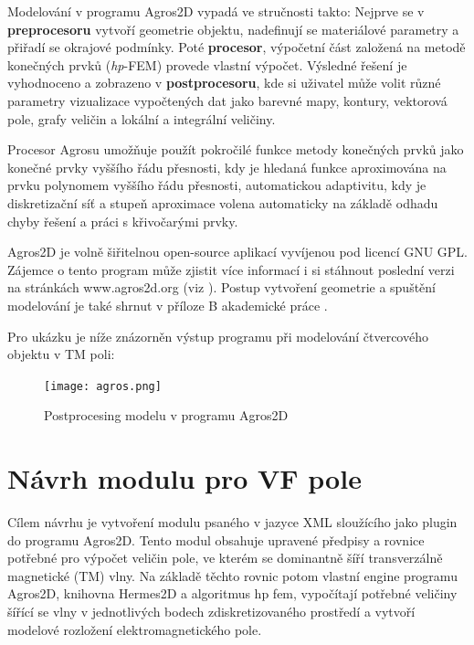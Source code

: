\documentclass[12pt,a4paper,oneside]{article}
\numberwithin{equation}{section} %
\numberwithin{figure}{section} %
\numberwithin{table}{section} %
\begin{document}
Modelování v programu Agros2D vypadá ve stručnosti takto: Nejprve se v \textbf{preprocesoru} vytvoří geometrie objektu, nadefinují se materiálové parametry a přiřadí se okrajové podmínky. Poté \textbf{procesor}, výpočetní část založená na metodě konečných prvků (\textit{hp}-FEM) provede vlastní výpočet. Výsledné řešení je vyhodnoceno a zobrazeno v \textbf{postprocesoru}, kde si uživatel může volit různé parametry vizualizace vypočtených dat jako barevné mapy, kontury, vektorová pole, grafy veličin a lokální a integrální veličiny. 

Procesor Agrosu umožňuje použít pokročilé funkce metody konečných prvků jako konečné prvky vyššího řádu přesnosti, kdy je hledaná funkce aproximována na prvku polynomem vyššího řádu přesnosti, automatickou adaptivitu, kdy je diskretizační síť a stupeň aproximace volena automaticky na základě odhadu chyby řešení a práci s křivočarými prvky.

Agros2D je volně šiřitelnou open-source aplikací vyvíjenou pod licencí GNU GPL. Zájemce o tento program může zjistit více informací i si stáhnout poslední verzi na stránkách www.agros2d.org (viz \cite{Agros}). Postup vytvoření geometrie a spuštění modelování je také shrnut v příloze B akademické práce \cite{Koudela}.

Pro ukázku je níže znázorněn výstup programu při modelování čtvercového objektu v TM poli:
\begin{figure}[h] %
\begin{center}
\texttt{[image: agros.png]} %
\caption{Postprocesing modelu v programu Agros2D} %
\end{center}
\end{figure}



\newpage
\section{Návrh modulu pro VF pole}
Cílem návrhu je vytvoření modulu psaného v jazyce XML sloužícího jako plugin do programu Agros2D. Tento modul obsahuje upravené předpisy a rovnice potřebné pro výpočet veličin pole, ve kterém se dominantně šíří transverzálně magnetické (TM) vlny. Na základě těchto rovnic potom vlastní engine programu Agros2D, knihovna Hermes2D a algoritmus hp fem, vypočítají potřebné veličiny šířící se vlny v jednotlivých bodech zdiskretizovaného prostředí a vytvoří modelové rozložení elektromagnetického pole.
\end{document}
